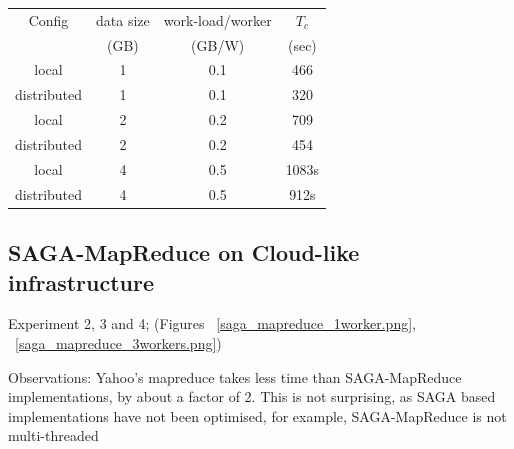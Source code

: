 \documentclass[conference,final]{IEEEtran}
\newcommand{\sagamapreduce }{SAGA-MapReduce }
\begin{document}
\begin{tabular}{cccc}
  \hline
  Config  &  data size   &   work-load/worker & $T_c$  \\
  &   (GB)  & (GB/W) & (sec) \\
  \hline
  local & 1 & 0.1 & 466 \\
  \hline
  distributed & 1 & 0.1 & 320 \\
  \hline \hline
  local & 2 & 0.2 & 709 \\
  \hline 
  distributed & 2 & 0.2 & 454 \\
  \hline \hline
local &  4 & 0.5 & 1083s\\
\hline
distributed &  4 &  0.5&  912s \\
\hline \hline
\end{tabular}





\subsection{SAGA-MapReduce on Cloud-like infrastructure}


Experiment 2, 3 and 4; 
(Figures ~\ref{saga_mapreduce_1worker.png}, ~\ref{saga_mapreduce_3workers.png})

Observations: Yahoo's mapreduce takes less time than \sagamapreduce
implementations, by about a factor of 2. This is not surprising, as
SAGA based implementations have not been optimised, for example,
\sagamapreduce is not multi-threaded
\end{document}
